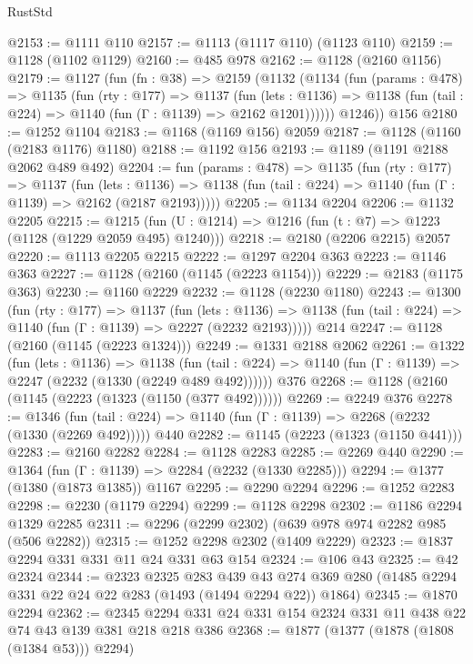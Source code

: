 \begin{lexlean}{RustStd}
\begin{coremodule}
@2153 := @1111 @110
@2157 := @1113 (@1117 @110) (@1123 @110)
@2159 := @1128 (@1102 @1129)
@2160 := @485 @978
@2162 := @1128 (@2160 @1156)
@2179 := @1127
    (fun (fn : @38) =>
    @2159
      (@1132
        (@1134
          (fun (params : @478) =>
          @1135
            (fun (rty : @177) =>
            @1137
              (fun (lets : @1136) =>
              @1138 (fun (tail : @224) => @1140 (fun (Γ : @1139) => @2162 @1201))))))
        @1246))
    @156
@2180 := @1252 @1104
@2183 := @1168 (@1169 @156) @2059
@2187 := @1128 (@1160 (@2183 @1176) @1180)
@2188 := @1192 @156
@2193 := @1189 (@1191 @2188 @2062 @489 @492)
@2204 := fun (params : @478) =>
  @1135
    (fun (rty : @177) =>
    @1137
      (fun (lets : @1136) =>
      @1138 (fun (tail : @224) => @1140 (fun (Γ : @1139) => @2162 (@2187 @2193)))))
@2205 := @1134 @2204
@2206 := @1132 @2205
@2215 := @1215 (fun (U : @1214) => @1216 (fun (t : @7) => @1223 (@1128 (@1229 @2059 @495) @1240)))
@2218 := @2180 (@2206 @2215) @2057
@2220 := @1113 @2205 @2215
@2222 := @1297 @2204 @363
@2223 := @1146 @363
@2227 := @1128 (@2160 (@1145 (@2223 @1154)))
@2229 := @2183 (@1175 @363)
@2230 := @1160 @2229
@2232 := @1128 (@2230 @1180)
@2243 := @1300
    (fun (rty : @177) =>
    @1137
      (fun (lets : @1136) =>
      @1138 (fun (tail : @224) => @1140 (fun (Γ : @1139) => @2227 (@2232 @2193)))))
    @214
@2247 := @1128 (@2160 (@1145 (@2223 @1324)))
@2249 := @1331 @2188 @2062
@2261 := @1322
    (fun (lets : @1136) =>
    @1138 (fun (tail : @224) => @1140 (fun (Γ : @1139) => @2247 (@2232 (@1330 (@2249 @489 @492))))))
    @376
@2268 := @1128 (@2160 (@1145 (@2223 (@1323 (@1150 (@377 @492))))))
@2269 := @2249 @376
@2278 := @1346
    (fun (tail : @224) => @1140 (fun (Γ : @1139) => @2268 (@2232 (@1330 (@2269 @492)))))
    @440
@2282 := @1145 (@2223 (@1323 (@1150 @441)))
@2283 := @2160 @2282
@2284 := @1128 @2283
@2285 := @2269 @440
@2290 := @1364 (fun (Γ : @1139) => @2284 (@2232 (@1330 @2285)))
@2294 := @1377 (@1380 (@1873 @1385)) @1167
@2295 := @2290 @2294
@2296 := @1252 @2283
@2298 := @2230 (@1179 @2294)
@2299 := @1128 @2298
@2302 := @1186 @2294 @1329 @2285
@2311 := @2296 (@2299 @2302) (@639 @978 @974 @2282 @985 (@506 @2282))
@2315 := @1252 @2298 @2302 (@1409 @2229)
@2323 := @1837 @2294 @331 @331 @11 @24 @331 @63 @154
@2324 := @106 @43
@2325 := @42 @2324
@2344 := @2323
    @2325
    @283
    @439
    @43
    @274
    @369
    @280
    (@1485 @2294 @331 @22 @24 @22 @283 (@1493 (@1494 @2294 @22)) @1864)
@2345 := @1870 @2294
@2362 := @2345 @2294 @331 @24 @331 @154 @2324 @331 @11 @438 @22 @74 @43 @139 @381 @218 @218 @386
@2368 := @1877 (@1377 (@1878 (@1808 (@1384 @53))) @2294)

\end{coremodule}
\end{lexlean}

